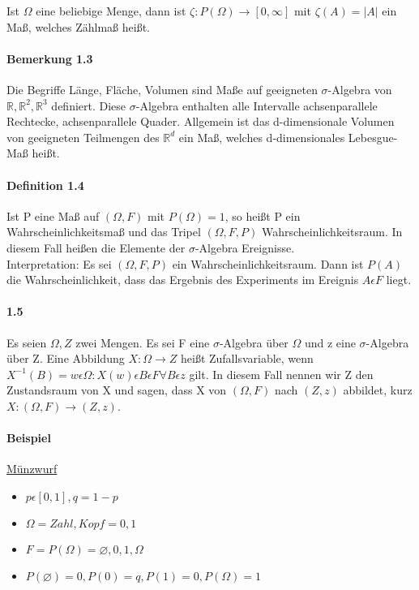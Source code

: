 \documentclass[paper=a4, fontsize=11pt]{scrartcl}
\numberwithin{equation}{section}
\numberwithin{figure}{section}
\numberwithin{table}{section}
\begin{document}
Ist $\Omega$ eine beliebige Menge, dann ist $\zeta : P(\Omega) \rightarrow [0, \infty ]$ mit $\zeta (A) = |A| $ ein Maß, welches Zählmaß heißt.

\paragraph{Bemerkung 1.3}

Die Begriffe Länge, Fläche, Volumen sind Maße auf geeigneten $\sigma$-Algebra von $ \mathbb{R}, \mathbb{R}^{2} , \mathbb{R}^{3}$ definiert. Diese $\sigma$-Algebra enthalten alle Intervalle achsenparallele Rechtecke, achsenparallele Quader. Allgemein ist das d-dimensionale Volumen von geeigneten Teilmengen des $\mathbb{R}^{d}$ ein Maß, welches d-dimensionales Lebesgue-Maß heißt.

\paragraph{Definition 1.4}

Ist P eine Maß auf $(\Omega, F)$ mit $P (\Omega) = 1$, so heißt P ein Wahrscheinlichkeitsmaß und das Tripel $(\Omega, F, P)$ Wahrscheinlichkeitsraum. In diesem Fall heißen die Elemente der $\sigma$-Algebra Ereignisse. \\

Interpretation: Es sei $(\Omega, F, P)$ ein Wahrscheinlichkeitsraum. Dann ist $P (A)$ die Wahrscheinlichkeit, dass das Ergebnis des Experiments im Ereignis $A \epsilon F$ liegt.

\paragraph{1.5}

Es seien $\Omega , Z$ zwei Mengen. Es sei F eine $\sigma$-Algebra über $\Omega$ und z eine $\sigma$-Algebra über Z. Eine Abbildung $X: \Omega \rightarrow Z$ heißt Zufallsvariable, wenn $X^{-1}(B)= {w \epsilon \Omega: X(w) \epsilon B} \epsilon F \forall B \epsilon z$ gilt. In diesem Fall nennen wir Z den Zustandsraum von X und sagen, dass X von $(\Omega, F)$ nach $(Z,z)$ abbildet, kurz $X:(\Omega, F) \rightarrow (Z,z)$.

\paragraph{Beispiel}

\underline{Münzwurf}

\begin{itemize}
\item $p \epsilon [0,1], q = 1-p$
\item $\Omega={Zahl, Kopf}={0,1}$
\item $F = P (\Omega) = { \varnothing, {0}, {1}, \Omega}$
\item $P (\varnothing) = 0, P ({0}) = q, P({1}) = 0, P(\Omega) = 1$
\end{itemize}
\end{document}
